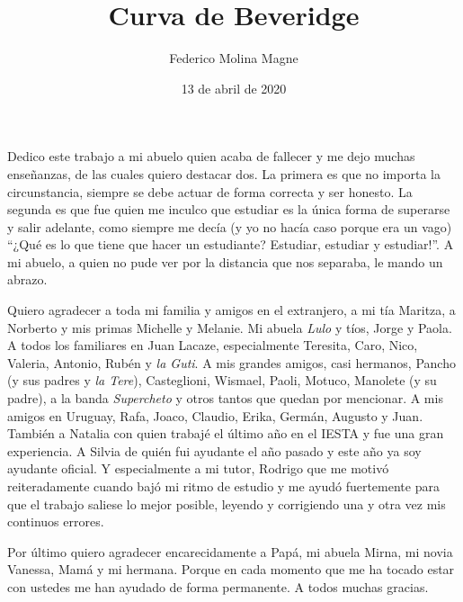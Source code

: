 \documentclass[12pt,oneside]{reedthesis}
\title{Curva de Beveridge}
\author{Federico Molina Magne}
\date{13 de abril de 2020}
\begin{document}
  \maketitle



\frontmatter %
\pagestyle{empty} %
  \begin{dedication}
    Dedico este trabajo a mi abuelo quien acaba de fallecer y me dejo muchas enseñanzas, de las cuales quiero destacar dos. La primera es que no importa la circunstancia, siempre se debe actuar de forma correcta y ser honesto. La segunda es que fue quien me inculco que estudiar es la única forma de superarse y salir adelante, como siempre me decía (y yo no hacía caso porque era un vago) ``¿Qué es lo que tiene que hacer un estudiante? Estudiar, estudiar y estudiar!''. A mi abuelo, a quien no pude ver por la distancia que nos separaba, le mando un abrazo.
  \end{dedication}
  \begin{acknowledgements}
    Quiero agradecer a toda mi familia y amigos en el extranjero, a mi tía Maritza, a Norberto y mis primas Michelle y Melanie. Mi abuela \emph{Lulo} y tíos, Jorge y Paola. A todos los familiares en Juan Lacaze, especialmente Teresita, Caro, Nico, Valeria, Antonio, Rubén y \emph{la Guti}. A mis grandes amigos, casi hermanos, Pancho (y sus padres y \emph{la Tere}), Casteglioni, Wismael, Paoli, Motuco, Manolete (y su padre), a la banda \emph{Supercheto} y otros tantos que quedan por mencionar. A mis amigos en Uruguay, Rafa, Joaco, Claudio, Erika, Germán, Augusto y Juan. También a Natalia con quien trabajé el último año en el IESTA y fue una gran experiencia. A Silvia de quién fui ayudante el año pasado y este año ya soy ayudante oficial. Y especialmente a mi tutor, Rodrigo que me motivó reiteradamente cuando bajó mi ritmo de estudio y me ayudó fuertemente para que el trabajo saliese lo mejor posible, leyendo y corrigiendo una y otra vez mis continuos errores.
    
    Por último quiero agradecer encarecidamente a Papá, mi abuela Mirna, mi novia Vanessa, Mamá y mi hermana. Porque en cada momento que me ha tocado estar con ustedes me han ayudado de forma permanente.
    A todos muchas gracias.
  \end{acknowledgements}
\end{document}
